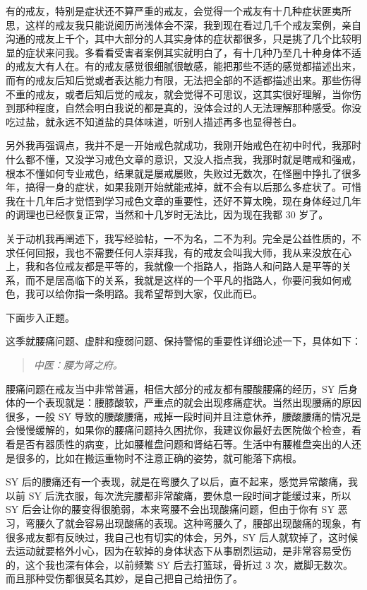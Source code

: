 \documentclass[fontset=founder]{ctexart}
\begin{document}
有的戒友，特别是症状还不算严重的戒友，会觉得一个戒友有十几种症状匪夷所思，这样的戒友我只能说阅历尚浅体会不深，我到现在看过几千个戒友案例，亲自沟通的戒友上千个，其中大部分的人其实身体的症状都很多，只是挑了几个比较明显的症状来问我。多看看受害者案例其实就明白了，有十几种乃至几十种身体不适的戒友大有人在。有的戒友感觉很细腻很敏感，能把那些不适的感觉都描述出来，而有的戒友后知后觉或者表达能力有限，无法把全部的不适都描述出来。那些伤得不重的戒友，或者后知后觉的戒友，就会觉得不可思议，这其实很好理解，当你伤到那种程度，自然会明白我说的都是真的，没体会过的人无法理解那种感受。你没吃过盐，就永远不知道盐的具体味道，听别人描述再多也显得苍白。

另外我再强调点，我并不是一开始戒色就成功，我刚开始戒色在初中时代，我那时什么都不懂，又没学习戒色文章的意识，又没人指点我，我那时就是瞎戒和强戒，根本不懂如何专业戒色，结果就是屡戒屡败，失败过无数次，在怪圈中挣扎了很多年，搞得一身的症状，如果我刚开始就能戒掉，就不会有以后那么多症状了。可惜我在十几年后才觉悟到学习戒色文章的重要性，还好不算太晚，现在身体经过几年的调理也已经恢复正常，当然和十几岁时无法比，因为现在我都 30 岁了。

关于动机我再阐述下，我写经验帖，一不为名，二不为利。完全是公益性质的，不求任何回报，我也不需要任何人崇拜我，有的戒友会叫我大师，我从来没放在心上，我和各位戒友都是平等的，我就像一个指路人，指路人和问路人是平等的关系，而不是居高临下的关系，我就是这样的一个平凡的指路人，你要问我如何戒色，我可以给你指一条明路。我希望帮到大家，仅此而已。

下面步入正题。

这季就腰痛问题、虚胖和瘦弱问题、保持警惕的重要性详细论述一下，具体如下：

\begin{quote}\it
    中医：腰为肾之府。
\end{quote}

腰痛问题在戒友当中非常普遍，相信大部分的戒友都有腰酸腰痛的经历，SY 后身体的一个表现就是：腰膝酸软，严重点的就会出现疼痛症状。当然出现腰痛的原因很多，一般 SY 导致的腰酸腰痛，戒掉一段时间并且注意休养，腰酸腰痛的情况是会慢慢缓解的，如果你的腰痛问题持久困扰你，我建议你最好去医院做个检查，看看是否有器质性的病变，比如腰椎盘问题和肾结石等。生活中有腰椎盘突出的人还是很多的，比如在搬运重物时不注意正确的姿势，就可能落下病根。

SY 后的腰痛还有一个表现，就是在弯腰久了以后，直不起来，感觉异常酸痛，我以前 SY 后洗衣服，每次洗完腰都非常酸痛，要休息一段时间才能缓过来，所以 SY 后会让你的腰变得很脆弱，本来弯腰不会出现酸痛问题，但由于你有 SY 恶习，弯腰久了就会容易出现酸痛的表现。这种弯腰久了，腰部出现酸痛的现象，有很多戒友都有反映过，我自己也有切实的体会，另外，SY 后人就软掉了，这时候去运动就要格外小心，因为在软掉的身体状态下从事剧烈运动，是非常容易受伤的，这个我也深有体会，以前频繁 SY 后去打篮球，骨折过 3 次，崴脚无数次。而且那种受伤都很莫名其妙，是自己把自己给扭伤了。
\end{document}
